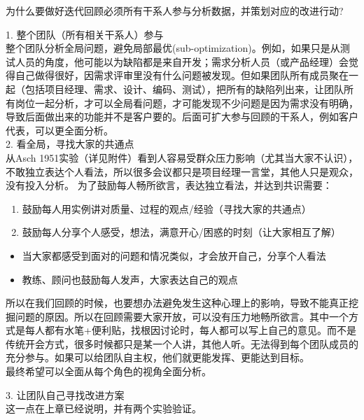 为什么要做好迭代回顾必须所有干系人参与分析数据，并策划对应的改进行动?

1. 整个团队（所有相关干系人）参与\\
整个团队分析全局问题，避免局部最优(sub-optimization)。例如，如果只是从测试人员的角度，他可能以为缺陷都是来自开发；需求分析人员（或产品经理）会觉得自己做得很好，因需求评审里没有什么问题被发现。但如果团队所有成员聚在一起（包括项目经理、需求、设计、编码、测试），把所有的缺陷列出来，让团队所有岗位一起分析，才可以全局看问题，才可能发现不少问题是因为需求没有明确，导致后面做出来的功能并不是客户要的。后面可扩大参与回顾的干系人，例如客户代表，可以更全面分析。\\
2. 看全局，寻找大家的共通点\\
从Asch
1951实验（详见附件）看到人容易受群众压力影响（尤其当大家不认识），不敢独立表达个人看法，所以很多会议都只是项目经理一言堂，其他人只是观众，没有投入分析。
为了鼓励每人畅所欲言，表达独立看法，并达到共识需要：

\begin{enumerate}
\tightlist
\item
  鼓励每人用实例讲对质量、过程的观点/经验（寻找大家的共通点）
\item
  鼓励每人分享个人感受，想法，满意开心/困惑的时刻（让大家相互了解）
\end{enumerate}

\begin{itemize}
\tightlist
\item
  当大家都感受到面对的问题和情况类似，才会放开自己，分享个人看法
\item
  教练、顾问也鼓励每人发声，大家表达自己的观点
\end{itemize}

所以在我们回顾的时候，也要想办法避免发生这种心理上的影响，导致不能真正挖掘问题的原因。所以在回顾需要大家开放，可以没有压力地畅所欲言。其中一个方式是每人都有水笔+便利贴，找根因讨论时，每人都可以写上自己的意见。而不是传统开会方式，很多时候都只是某一个人讲，其他人听。无法得到每个团队成员的充分参与。如果可以给团队自主权，他们就更能发挥、更能达到目标。\\
最终希望可以全面从每个角色的视角全面分析。

3. 让团队自己寻找改进方案\\

这一点在上章已经说明，并有两个实验验证。

